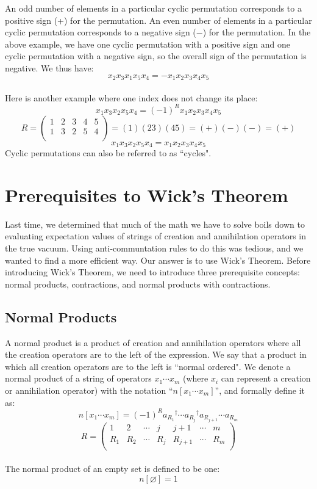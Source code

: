 \documentclass{article}
\newcommand{\dg}{\ensuremath{^\dagger} }
\newcommand{\cd}{\ensuremath{\cdots} }
\begin{document}
An odd number of elements in a particular cyclic permutation corresponds to a positive sign (+) for the permutation.
An even number of elements in a particular cyclic permutation corresponds to a negative sign ($-$) for the permutation. 
In the above example, we have one cyclic permutation with a positive sign and one cyclic permutation with a negative sign, so the overall sign of the permutation is negative.
We thus have: 
\[ x_2 x_3 x_1 x_5 x_4  = -x_1 x_2 x_3 x_4 x_5 \]
\\
Here is another example where one index does not change its place: 
\[ x_1 x_3 x_2 x_5 x_4  = (-1)^R x_1 x_2 x_3 x_4 x_5 \]
\begin{equation*}
R = 
\begin{pmatrix}
1 & 2 &3 & 4 & 5  \\
1 & 3 & 2 & 5 & 4 \\
\end{pmatrix}
= (1)(23)(45) = (+)(-)(-) = (+)
\end{equation*}
\[ x_1 x_3 x_2 x_5 x_4  =  x_1 x_2 x_3 x_4 x_5 \]
Cyclic permutations can also be referred to as ``cycles". 
\section{Prerequisites to Wick's Theorem}

Last time, we determined that much of the math we have to solve boils down to evaluating expectation values of 
strings of creation and annihilation operators in the true vacuum.
Using anti-communtation rules to do this was tedious, and we wanted to find a more efficient way. 
Our answer is to use Wick's Theorem. 
Before introducing Wick's Theorem, we need to introduce three prerequisite concepts: normal products, contractions, and normal products with contractions.

\subsection{Normal Products}
A normal product is a product of creation and annihilation operators where all the creation operators are to the left of the expression.
We say that a product in which all creation operators are to the left is ``normal ordered". 
We denote a normal product of a string of operators $x_1 \cd x_m$ (where $x_i$ can represent a creation or annihilation operator) with the notation ``$n[x_1 \cd x_m]$'', and formally define it as: 
\[n[x_1 \cd x_m]= (-1)^R a_{R_1}\dg \cd a_{R_j}\dg a_{R_{j+1}} \cd a_{R_m} \]
\[
R = 
\begin{pmatrix}
1 & 2 &\cd & j & j+1 & \cd & m  \\
R_1 & R_2 &\cd & R_j & R_{j+1} & \cd & R_m  \\
\end{pmatrix}
\] \\
The normal product of an empty set is defined to be one:
\[ n[\varnothing] = 1\]
\end{document}
